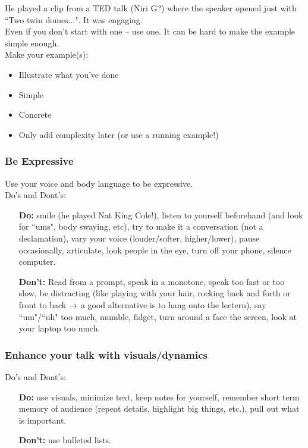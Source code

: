 He played a clip from a TED talk (Niri G?) where the speaker opened just with ``Two twin domes...". It was engaging. \\

Even if you don't start with one -- use one. It can be hard to make the example simple enough. \\

Make your example(s):
\begin{itemize}
    \item Illustrate what you've done
    \item Simple
    \item Concrete
    \item Only add complexity later (or use a running example!)
\end{itemize}

\subsubsection{Be Expressive}

Use your voice and body language to be expressive. \\

Do's and Dont's:
\begin{itemize}
    \item[{\bf Do:}]  smile (he played Nat King Cole!), listen to yourself beforehand (and look for ``ums", body swaying, etc), try to make it a conversation (not a declamation), vary your voice (louder/softer, higher/lower), pause occasionally, articulate, look people in the eye, turn off your phone, silence computer.
    
    \vspace{4mm}
    
    \item[{\bf Don't:}] Read from a prompt, speak in a monotone, speak too fast or too slow, be distracting (like playing with your hair, rocking back and forth or front to back $\rightarrow$ a good alternative is to hang onto the lectern), say ``um"/``uh" too much, mumble, fidget, turn around a face the screen, look at your laptop too much.
\end{itemize}

\subsubsection{Enhance your talk with visuals/dynamics}

Do's and Dont's:
\begin{itemize}
    \item[{\bf Do:}] use visuals, minimize text, keep notes for yourself, remember short term memory of audience (repeat details, highlight big things, etc.), pull out what is important. 
    \vspace{4mm}
    
    \item[{\bf Don't:}] use bulleted lists.
\end{itemize}

